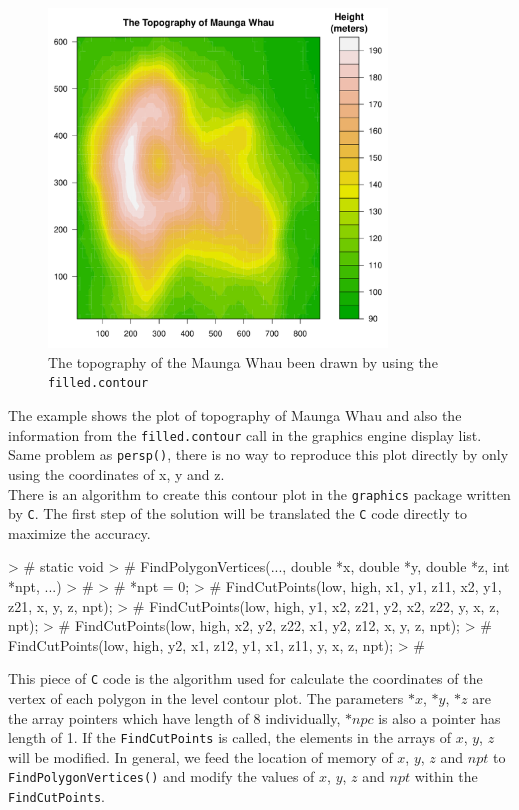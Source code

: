 \documentclass[paper=a4, fontsize=11pt]{report}
\begin{document}
\begin{figure}[h]
\begin{center}
  \includegraphics[height = 9cm, width = 9cm]{figure/filled_example_1.pdf}
  \caption{The topography of the Maunga Whau been drawn by using the \texttt{filled.contour}}
  	\label{figure8}
\end{center}
\end{figure}
The example shows the plot of topography of Maunga Whau and also the information from the \texttt{filled.contour} call in the graphics engine display list. Same problem as \texttt{persp()}, there is no way to reproduce this plot directly by only using the coordinates of x, y and z.\\

There is an algorithm to create this contour plot in the \texttt{graphics} package written by \texttt{C}. The first step of the solution will be translated the \texttt{C} code directly to maximize the accuracy.\\

\begin{Schunk}
\begin{Sinput}
> # static void
> # FindPolygonVertices(..., double *x, double *y, double *z, int *npt, ...)
> # {
> #   *npt = 0;
> #   FindCutPoints(low, high, x1,  y1,  z11, x2,  y1,  z21, x, y, z, npt);
> #   FindCutPoints(low, high, y1,  x2,  z21, y2,  x2,  z22, y, x, z, npt);
> #   FindCutPoints(low, high, x2,  y2,  z22, x1,  y2,  z12, x, y, z, npt);
> #   FindCutPoints(low, high, y2,  x1,  z12, y1,  x1,  z11, y, x, z, npt);
> # }
\end{Sinput}
\end{Schunk}
This piece of \texttt{C} code is the algorithm used for calculate the coordinates of the vertex of each polygon in the level contour plot. The parameters $*x$, $*y$, $*z$ are the array pointers which have length of 8 individually, $*npc$ is also a pointer has length of 1. If the \texttt{FindCutPoints} is called, the elements in the arrays of $x$, $y$, $z$ will be modified. In general, we feed the location of memory of $x$, $y$, $z$ and $npt$ to \texttt{FindPolygonVertices()} and modify the values of $x$, $y$, $z$ and $npt$ within the \texttt{FindCutPoints}.\\
\end{document}
